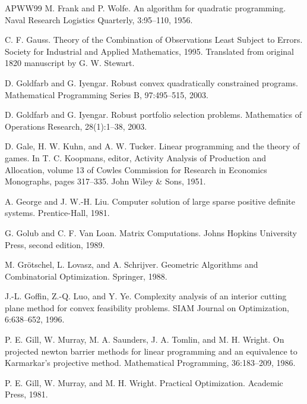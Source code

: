 \begin{thebibliography}{APWW99}
 M. Frank and P. Wolfe. An algorithm for quadratic programming. Naval Research Logistics Quarterly, 3:95–110, 1956.

 C. F. Gauss. Theory of the Combination of Observations Least Subject to Errors. Society for Industrial and Applied Mathematics, 1995. Translated from original 1820 manuscript by G. W. Stewart.

 D. Goldfarb and G. Iyengar. Robust convex quadratically constrained programs. Mathematical Programming Series B, 97:495–515, 2003.

 D. Goldfarb and G. Iyengar. Robust portfolio selection problems. Mathematics of Operations Research, 28(1):1–38, 2003.

 D. Gale, H. W. Kuhn, and A. W. Tucker. Linear programming and the theory of games. In T. C. Koopmans, editor, Activity Analysis of Production and Allocation, volume 13 of Cowles Commission for Research in Economics Monographs, pages 317–335. John Wiley \& Sons, 1951.

 A. George and J. W.-H. Liu. Computer solution of large sparse positive definite systems. Prentice-Hall, 1981.

 G. Golub and C. F. Van Loan. Matrix Computations. Johns Hopkins University Press, second edition, 1989.

 M. Grötschel, L. Lovasz, and A. Schrijver. Geometric Algorithms and Combinatorial Optimization. Springer, 1988.

 J.-L. Goffin, Z.-Q. Luo, and Y. Ye. Complexity analysis of an interior cutting plane method for convex feasibility problems. SIAM Journal on Optimization, 6:638–652, 1996.

 P. E. Gill, W. Murray, M. A. Saunders, J. A. Tomlin, and M. H. Wright. On projected newton barrier methods for linear programming and an equivalence to Karmarkar’s projective method. Mathematical Programming, 36:183–209, 1986.

 P. E. Gill, W. Murray, and M. H. Wright. Practical Optimization. Academic Press, 1981.


\end{thebibliography}
